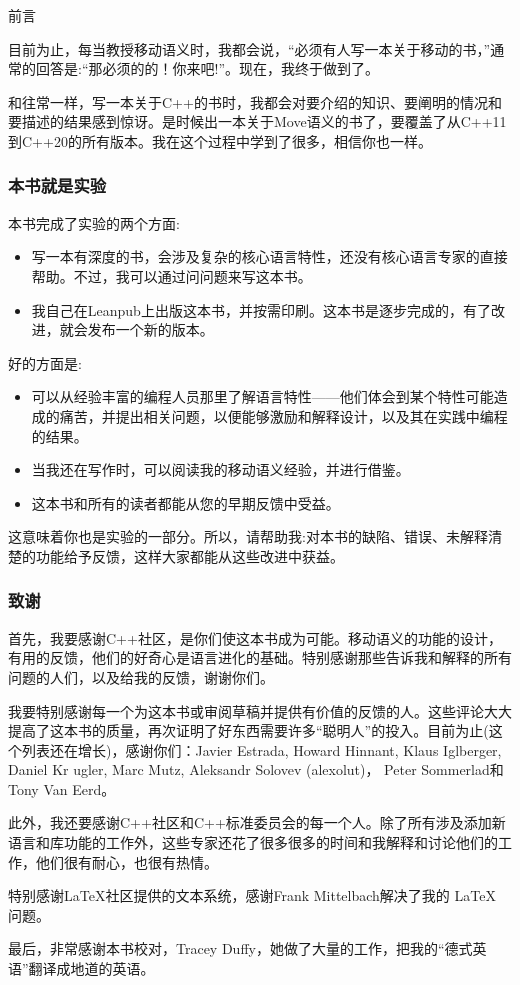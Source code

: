 \begin{flushright}
	 前言
\end{flushright}

目前为止，每当教授移动语义时，我都会说，“必须有人写一本关于移动的书，”通常的回答是:“那必须的的！你来吧!”。现在，我终于做到了。

和往常一样，写一本关于C++的书时，我都会对要介绍的知识、要阐明的情况和要描述的结果感到惊讶。是时候出一本关于Move语义的书了，要覆盖了从C++11到C++20的所有版本。我在这个过程中学到了很多，相信你也一样。 

\subsubsection{本书就是实验}

本书完成了实验的两个方面:
\begin{itemize}
	\item 写一本有深度的书，会涉及复杂的核心语言特性，还没有核心语言专家的直接帮助。不过，我可以通过问问题来写这本书。
	\item 我自己在Leanpub上出版这本书，并按需印刷。这本书是逐步完成的，有了改进，就会发布一个新的版本。
\end{itemize}

好的方面是:
\begin{itemize}
	\item 可以从经验丰富的编程人员那里了解语言特性——他们体会到某个特性可能造成的痛苦，并提出相关问题，以便能够激励和解释设计，以及其在实践中编程的结果。
	\item 当我还在写作时，可以阅读我的移动语义经验，并进行借鉴。
	\item 这本书和所有的读者都能从您的早期反馈中受益。
\end{itemize}

这意味着你也是实验的一部分。所以，请帮助我:对本书的缺陷、错误、未解释清楚的功能给予反馈，这样大家都能从这些改进中获益。

\subsubsection{致谢}

首先，我要感谢C++社区，是你们使这本书成为可能。移动语义的功能的设计，有用的反馈，他们的好奇心是语言进化的基础。特别感谢那些告诉我和解释的所有问题的人们，以及给我的反馈，谢谢你们。

我要特别感谢每一个为这本书或审阅草稿并提供有价值的反馈的人。这些评论大大提高了这本书的质量，再次证明了好东西需要许多“聪明人”的投入。目前为止(这个列表还在增长)，感谢你们：Javier Estrada, Howard Hinnant, Klaus Iglberger, Daniel Kr ugler, Marc Mutz, Aleksandr Solovev (alexolut)， Peter Sommerlad和Tony Van Eerd。

此外，我还要感谢C++社区和C++标准委员会的每一个人。除了所有涉及添加新语言和库功能的工作外，这些专家还花了很多很多的时间和我解释和讨论他们的工作，他们很有耐心，也很有热情。

特别感谢LaTeX社区提供的文本系统，感谢Frank Mittelbach解决了我的 \LaTeX{} 问题。

最后，非常感谢本书校对，Tracey Duffy，她做了大量的工作，把我的“德式英语”翻译成地道的英语。


















